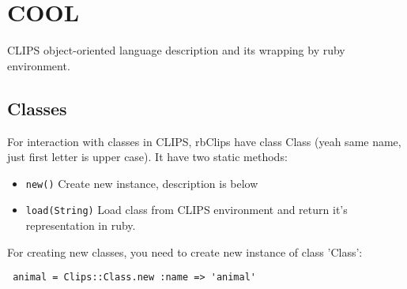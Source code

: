 \documentclass[a4paper,10pt]{article}
\begin{document}
\section{COOL}
CLIPS object-oriented language description and its wrapping by ruby environment.

\subsection{Classes}
For interaction with classes in CLIPS, rbClips have class Class (yeah same name, just first letter is upper case). It have two static methods:
\begin{itemize}
 \item \texttt{new()} Create new instance, description is below
 \item \texttt{load(String)} Load class from CLIPS environment and return it's representation in ruby.
\end{itemize}

For creating new classes, you need to create new instance of class 'Class':
\begin{verbatim}
 animal = Clips::Class.new :name => 'animal'
\end{verbatim}
\end{document}
